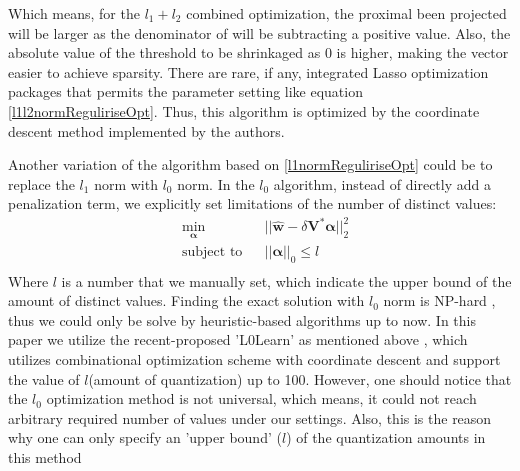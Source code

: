 \documentclass[preprint,10pt]{elsarticle}
\begin{document}
Which means, for the $l_1 + l_2$ combined optimization, the proximal been projected will be larger as the denominator of will be subtracting a positive value. Also, the absolute value of the threshold to be shrinkaged as $0$ is higher, making the vector easier to achieve sparsity. There are rare, if any, integrated Lasso optimization packages that permits the parameter setting like equation \ref{l1l2normReguliriseOpt}. Thus, this algorithm is optimized by the coordinate descent method implemented by the authors. \par
Another variation of the algorithm based on \ref{l1normReguliriseOpt} could be to replace the $l_1$ norm with $l_0$ norm. In the $l_0$ algorithm, instead of directly add a penalization term, we explicitly set limitations of the number of distinct values:
\begin{equation}\label{l0normReguliriseOpt}
\begin{aligned}
& \underset{\boldsymbol{\alpha}}{\text{min}}
& & ||\boldsymbol{\hat{w}} -\delta\boldsymbol{V^{*}}\boldsymbol{\alpha}||_{2}^{2} \\
& \text{subject to}
& & ||\boldsymbol{\alpha}||_{0} \leq l \\
\end{aligned}
\end{equation}
Where $l$ is a number that we manually set, which indicate the upper bound of the amount of distinct values. Finding the exact solution with $l_0$ norm is NP-hard \cite{L0NPhardPaper}, thus we could only be solve by heuristic-based algorithms up to now. In this paper we utilize the recent-proposed 'L0Learn' as mentioned above \cite{l0Learn2018Hazimeh}, which utilizes combinational optimization scheme with coordinate descent and support the value of $l$(amount of quantization) up to 100. However, one should notice that the $l_0$ optimization method is not universal, which means, it could not reach arbitrary required number of values under our settings. Also, this is the reason why one can only specify an 'upper bound' ($l$) of the quantization amounts in this method
\end{document}
